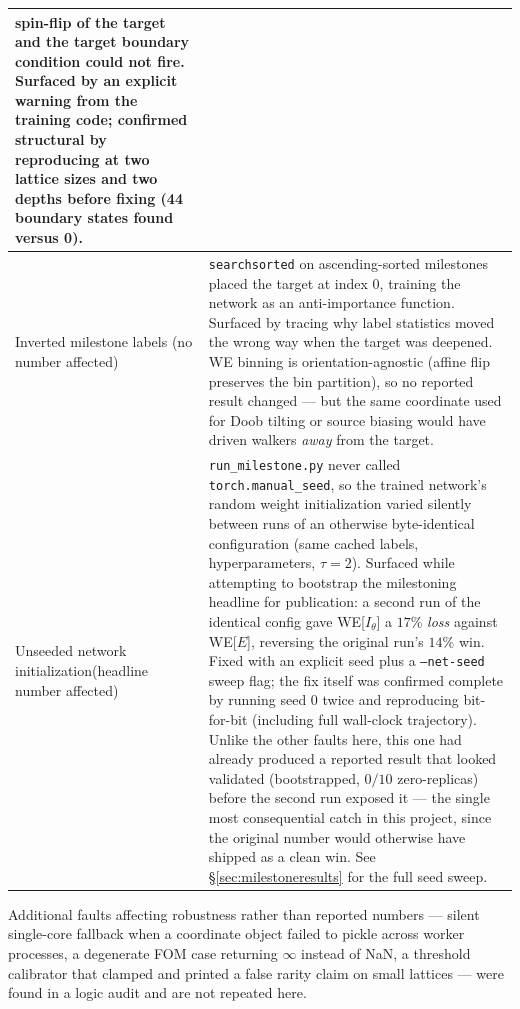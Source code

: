 \documentclass[11pt,a4paper]{article}
\begin{document}
\begin{table}[H]
\begin{tabular}{p{2.5cm}p{11.6cm}}
spin-flip of the target and the target boundary condition could not fire. Surfaced by an explicit
warning from the training code; confirmed structural by reproducing at two lattice sizes and two
depths before fixing (44 boundary states found versus 0).\\\midrule
Inverted milestone labels
\textcolor{green!45!black}{(no number affected)} &
\texttt{searchsorted} on ascending-sorted milestones placed the target at index 0, training the
network as an anti-importance function. Surfaced by tracing why label statistics moved the wrong
way when the target was deepened. WE binning is orientation-agnostic (affine flip preserves the
bin partition), so no reported result changed --- but the same coordinate used for Doob tilting
or source biasing would have driven walkers \emph{away} from the target.\\\midrule
Unseeded network initialization\label{man:seedbug}
\textcolor{red!55!black}{(headline number affected)} &
\texttt{run\_milestone.py} never called \texttt{torch.manual\_seed}, so the trained network's
random weight initialization varied silently between runs of an otherwise byte-identical
configuration (same cached labels, hyperparameters, $\tau=2$). Surfaced while attempting to
bootstrap the milestoning headline for publication: a second run of the identical config gave
WE[$I_\theta$] a $17\%$ \emph{loss} against WE[$E$], reversing the original run's $14\%$ win.
Fixed with an explicit seed plus a \texttt{--net-seed} sweep flag; the fix itself was confirmed
complete by running seed 0 twice and reproducing bit-for-bit (including full wall-clock
trajectory). Unlike the other faults here, this one had already produced a reported result that
looked validated (bootstrapped, $0/10$ zero-replicas) before the second run exposed it --- the
single most consequential catch in this project, since the original number would otherwise have
shipped as a clean win. See \S\ref{sec:milestoneresults} for the full seed sweep.\\
\bottomrule\end{tabular}
\end{table}

Additional faults affecting robustness rather than reported numbers --- silent single-core
fallback when a coordinate object failed to pickle across worker processes, a degenerate FOM case
returning $\infty$ instead of NaN, a threshold calibrator that clamped and printed a false rarity
claim on small lattices --- were found in a logic audit and are not repeated here.
\end{document}

